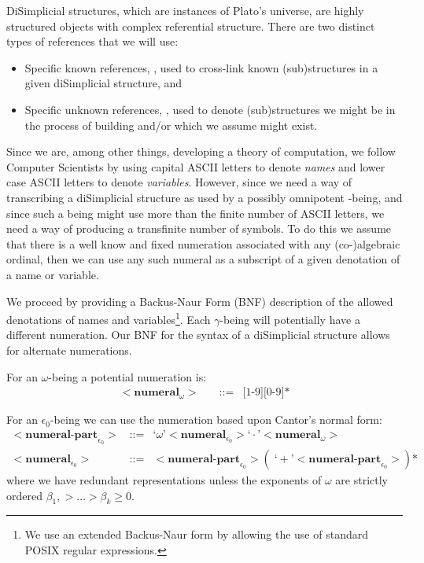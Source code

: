 \documentclass[a4paper,openany]{amsbook}
\begin{document}
DiSimplicial structures, which are instances of Plato's universe, are highly
structured objects with complex referential structure. There are two
distinct types of references that we will use: 
%
\begin{itemize}
%
\item Specific known references, , used to cross-link known
(sub)structures in a given diSimplicial structure, and 
%
\item Specific unknown references, , used to denote
(sub)structures we might be in the process of building and/or which we assume
might exist. 
%
\end{itemize}
%

Since we are, among other things, developing a theory of computation, we follow
Computer Scientists by using capital ASCII letters to denote \emph{names} and
lower case ASCII letters to denote \emph{variables}. However, since we need a
way of transcribing a diSimplicial structure as used by a possibly omnipotent
\Cardinal-being, and since such a being might use more than the finite number of
ASCII letters, we need a way of producing a transfinite number of symbols. To do
this we assume that there is a well know and fixed numeration associated with
any (co-)algebraic ordinal, then we can use any such numeral as a subscript of a
given denotation of a name or variable.

We proceed by providing a Backus-Naur Form (BNF) description of the allowed
denotations of names and variables\footnote{We use an extended Backus-Naur form
by allowing the use of standard POSIX regular expressions.}. Each $\gamma$-being
will potentially have a different numeration. Our BNF for the syntax of a
diSimplicial structure allows for alternate numerations.

\newcommand{\bnf}[2]{\ensuremath{<\textbf{#1}_{#2}>}}
\newcommand{\bnfAssign}{\text{::=}}
\newcommand{\bnfT}[1]{\text{`}#1\text{'}}

For an $\omega$-being a potential numeration is:
%
\begin{align*}
%
\bnf{numeral}{\omega} \quad & \bnfAssign & \text{[1-9]}\text{[0-9]*}
%
\end{align*}
%

For an $\epsilon_0$-being we can use the numeration based upon Cantor's normal
form:
%
\begin{align*}
%
\bnf{numeral-part}{\epsilon_0} \quad & \bnfAssign & 
  \bnfT{\omega} \bnf{numeral}{\epsilon_0} \bnfT{\cdot} \bnf{numeral}{\omega} \\
%
\bnf{numeral}{\epsilon_0} \quad & \bnfAssign & 
  \bnf{numeral-part}{\epsilon_0} ( \; \bnfT{+} \bnf{numeral-part}{\epsilon_0} ) \text{*}
%
\end{align*}
%
where we have redundant representations unless the exponents of $\omega$ are
strictly ordered $\beta_1, > \ldots > \beta_k \ge 0$.
\end{document}
